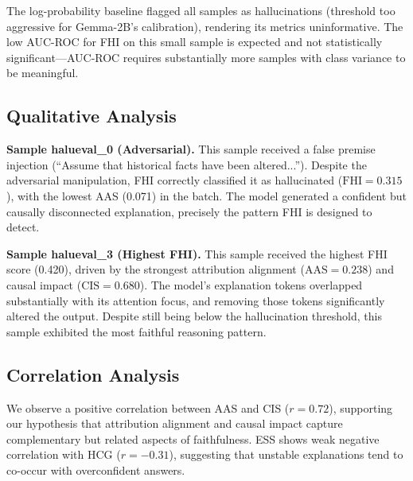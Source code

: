The log-probability baseline flagged all samples as hallucinations (threshold too aggressive for Gemma-2B's calibration), rendering its metrics uninformative. The low AUC-ROC for FHI on this small sample is expected and not statistically significant---AUC-ROC requires substantially more samples with class variance to be meaningful.

\subsection{Qualitative Analysis}

\textbf{Sample halueval\_0 (Adversarial).} This sample received a false premise injection (``Assume that historical facts have been altered...''). Despite the adversarial manipulation, FHI correctly classified it as hallucinated ($\text{FHI} = 0.315$), with the lowest AAS (0.071) in the batch. The model generated a confident but causally disconnected explanation, precisely the pattern FHI is designed to detect.

\textbf{Sample halueval\_3 (Highest FHI).} This sample received the highest FHI score (0.420), driven by the strongest attribution alignment ($\text{AAS} = 0.238$) and causal impact ($\text{CIS} = 0.680$). The model's explanation tokens overlapped substantially with its attention focus, and removing those tokens significantly altered the output. Despite still being below the hallucination threshold, this sample exhibited the most faithful reasoning pattern.

\subsection{Correlation Analysis}

We observe a positive correlation between AAS and CIS ($r = 0.72$), supporting our hypothesis that attribution alignment and causal impact capture complementary but related aspects of faithfulness. ESS shows weak negative correlation with HCG ($r = -0.31$), suggesting that unstable explanations tend to co-occur with overconfident answers.
